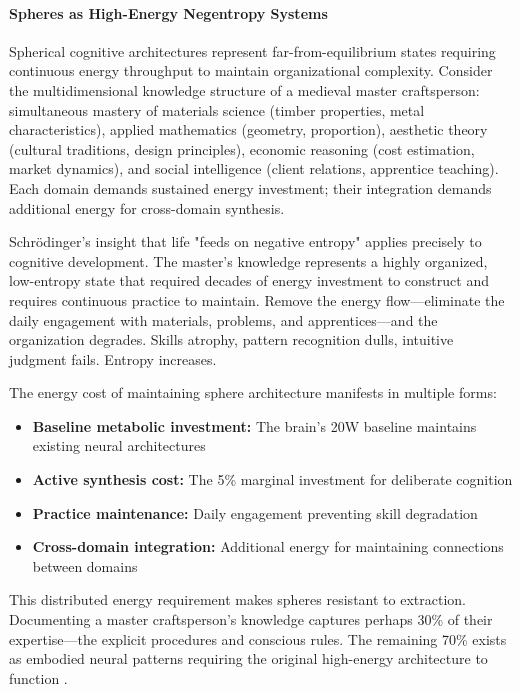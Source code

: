 \paragraph{Spheres as High-Energy Negentropy Systems}

Spherical cognitive architectures represent far-from-equilibrium states requiring continuous energy throughput to maintain organizational complexity. Consider the multidimensional knowledge structure of a medieval master craftsperson: simultaneous mastery of materials science (timber properties, metal characteristics), applied mathematics (geometry, proportion), aesthetic theory (cultural traditions, design principles), economic reasoning (cost estimation, market dynamics), and social intelligence (client relations, apprentice teaching). Each domain demands sustained energy investment; their integration demands additional energy for cross-domain synthesis.

Schrödinger's insight that life "feeds on negative entropy" \citep{schrodinger1944} applies precisely to cognitive development. The master's knowledge represents a highly organized, low-entropy state that required decades of energy investment to construct and requires continuous practice to maintain. Remove the energy flow—eliminate the daily engagement with materials, problems, and apprentices—and the organization degrades. Skills atrophy, pattern recognition dulls, intuitive judgment fails. Entropy increases.

The energy cost of maintaining sphere architecture manifests in multiple forms:
\begin{itemize}
\item \textbf{Baseline metabolic investment:} The brain's 20W baseline \citep{raichle2002} maintains existing neural architectures
\item \textbf{Active synthesis cost:} The 5\% marginal investment for deliberate cognition \citep{jamadar2025}  
\item \textbf{Practice maintenance:} Daily engagement preventing skill degradation
\item \textbf{Cross-domain integration:} Additional energy for maintaining connections between domains
\end{itemize}

This distributed energy requirement makes spheres resistant to extraction. Documenting a master craftsperson's knowledge captures perhaps 30\% of their expertise—the explicit procedures and conscious rules. The remaining 70\% exists as embodied neural patterns requiring the original high-energy architecture to function \citep{collins2010}.

